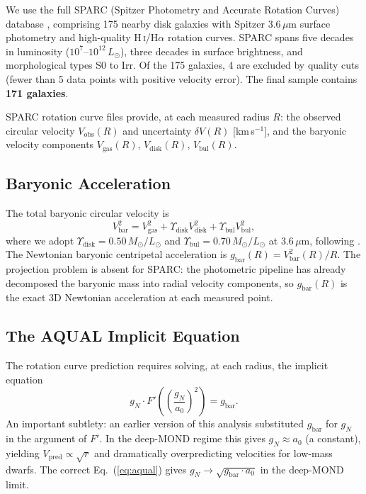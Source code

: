 \documentclass{aa}
\newcommand{\gbar}{g_\text{bar}}
\newcommand{\gN}{g_N}
\newcommand{\azero}{a_0}
\newcommand{\Upd}{\Upsilon_\text{disk}}
\newcommand{\Upb}{\Upsilon_\text{bul}}
\begin{document}
We use the full SPARC (Spitzer Photometry and Accurate Rotation Curves)
database \citep{Lelli2016}, comprising 175 nearby disk galaxies with Spitzer
3.6\,$\mu$m surface photometry and high-quality H\,\textsc{i}/H$\alpha$
rotation curves. SPARC spans five decades in luminosity
($10^7$--$10^{12}\,L_\odot$), three decades in surface brightness, and
morphological types S0 to Irr. Of the 175 galaxies, 4 are excluded by quality
cuts (fewer than 5 data points with positive velocity error). The final sample
contains \textbf{171 galaxies}.

SPARC rotation curve files provide, at each measured radius $R$: the observed
circular velocity $V_\text{obs}(R)$ and uncertainty $\delta V(R)$
[km\,s$^{-1}$], and the baryonic velocity components $V_\text{gas}(R)$,
$V_\text{disk}(R)$, $V_\text{bul}(R)$.

\subsection{Baryonic Acceleration}

The total baryonic circular velocity is
\begin{equation}
  V_\text{bar}^2 = V_\text{gas}^2
    + \Upd V_\text{disk}^2
    + \Upb V_\text{bul}^2,
\end{equation}
where we adopt $\Upd = 0.50$\,$M_\odot/L_\odot$ and
$\Upb = 0.70$\,$M_\odot/L_\odot$ at 3.6\,$\mu$m, following
\citet{McGaugh2015}. The Newtonian baryonic centripetal acceleration is
$\gbar(R) = V_\text{bar}^2(R)/R$. The projection problem is absent for
SPARC: the photometric pipeline has already decomposed the baryonic mass into
radial velocity components, so $\gbar(R)$ is the exact 3D Newtonian
acceleration at each measured point.

\subsection{The AQUAL Implicit Equation}

The rotation curve prediction requires solving, at each radius, the implicit
equation
\begin{equation}
  \gN \cdot F'\!\left(\left(\frac{\gN}{\azero}\right)^2\right) = \gbar.
  \label{eq:aqual}
\end{equation}
An important subtlety: an earlier version of this analysis substituted $\gbar$
for $\gN$ in the argument of $F'$. In the deep-MOND regime this gives
$\gN \approx \azero$ (a constant), yielding $V_\text{pred} \propto \sqrt{r}$
and dramatically overpredicting velocities for low-mass dwarfs. The correct
Eq.~(\ref{eq:aqual}) gives $\gN \to \sqrt{\gbar \cdot \azero}$ in the
deep-MOND limit.
\end{document}

